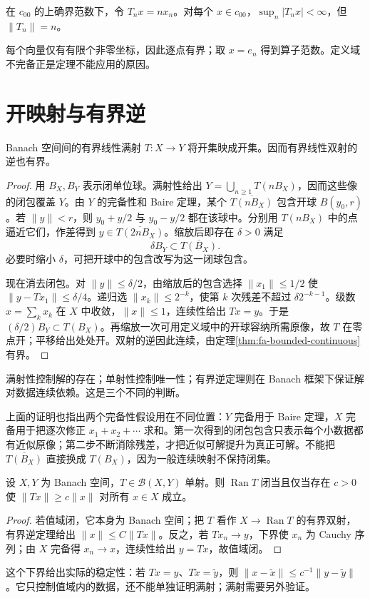 \documentclass[UTF8,12pt,a4paper,fontset=fandol]{ctexbook}
\begin{document}
\begin{example}[缺少完备性时]
在 $c_{00}$ 的上确界范数下，令 $T_nx=nx_n$。对每个 $x\in c_{00}$，$\sup_n|T_nx|<\infty$，但 $\|T_n\|=n$。
\end{example}
每个向量仅有有限个非零坐标，因此逐点有界；取 $x=e_n$ 得到算子范数。定义域不完备正是定理不能应用的原因。

\section{开映射与有界逆}
\begin{theorem}[开映射定理]\label{thm:fa-open-mapping}
Banach 空间间的有界线性满射 $T:X\to Y$ 将开集映成开集。因而有界线性双射的逆也有界。
\end{theorem}
\begin{proof}
用 $B_X,B_Y$ 表示闭单位球。满射性给出 $Y=\bigcup_{n\geq1}T(nB_X)$，因而这些像的闭包覆盖 $Y$。由 $Y$ 的完备性和 Baire 定理，某个 $\overline{T(nB_X)}$ 包含开球 $B(y_0,r)$。若 $\|y\|<r$，则 $y_0+y/2$ 与 $y_0-y/2$ 都在该球中。分别用 $T(nB_X)$ 中的点逼近它们，作差得到 $y\in\overline{T(2nB_X)}$。缩放后即存在 $\delta>0$ 满足
\[
 \delta B_Y\subset\overline{T(B_X)}.
\]
必要时缩小 $\delta$，可把开球中的包含改写为这一闭球包含。

现在消去闭包。对 $\|y\|\leq\delta/2$，由缩放后的包含选择 $\|x_1\|\leq1/2$ 使 $\|y-Tx_1\|\leq\delta/4$。递归选 $\|x_k\|\leq2^{-k}$，使第 $k$ 次残差不超过 $\delta2^{-k-1}$。级数 $x=\sum_kx_k$ 在 $X$ 中收敛，$\|x\|\leq1$，连续性给出 $Tx=y$。于是 $(\delta/2)B_Y\subset T(B_X)$。再缩放一次可用定义域中的开球容纳所需原像，故 $T$ 在零点开；平移给出处处开。双射的逆因此连续，由定理\ref{thm:fa-bounded-continuous}有界。
\end{proof}
满射性控制解的存在；单射性控制唯一性；有界逆定理则在 Banach 框架下保证解对数据连续依赖。这是三个不同的判断。

上面的证明也指出两个完备性假设用在不同位置：$Y$ 完备用于 Baire 定理，$X$ 完备用于把逐次修正 $x_1+x_2+\cdots$ 求和。第一次得到的闭包包含只表示每个小数据都有近似原像；第二步不断消除残差，才把近似可解提升为真正可解。不能把 $\overline{T(B_X)}$ 直接换成 $T(B_X)$，因为一般连续映射不保持闭集。

\begin{proposition}[闭值域与稳定下界]\label{prop:fa-closed-range-bound}
设 $X,Y$ 为 Banach 空间，$T\in\mathcal B(X,Y)$ 单射。则 $\operatorname{Ran}T$ 闭当且仅当存在 $c>0$ 使 $\|Tx\|\geq c\|x\|$ 对所有 $x\in X$ 成立。
\end{proposition}
\begin{proof}
若值域闭，它本身为 Banach 空间；把 $T$ 看作 $X\to\operatorname{Ran}T$ 的有界双射，有界逆定理给出 $\|x\|\leq C\|Tx\|$。反之，若 $Tx_n\to y$，下界使 $x_n$ 为 Cauchy 序列；由 $X$ 完备得 $x_n\to x$，连续性给出 $y=Tx$，故值域闭。
\end{proof}
这个下界给出实际的稳定性：若 $Tx=y$、$T\widetilde x=\widetilde y$，则 $\|x-\widetilde x\|\leq c^{-1}\|y-\widetilde y\|$。它只控制值域内的数据，还不能单独证明满射；满射需要另外验证。
\end{document}

